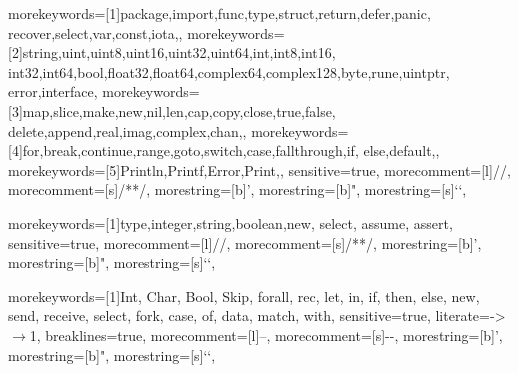 \usepackage[portuguese]{babel}
\usepackage[utf8]{inputenc}  %
\usepackage[T1]{fontenc}
\usepackage {listings}
\usepackage{tikz}
\usepackage{hyperref}

\usepackage{amsmath,amssymb}
\usepackage{listings,color}
\usepackage{alltt}
\usepackage{flushend}





%
  {morekeywords=[1]{package,import,func,type,struct,return,defer,panic,%
     recover,select,var,const,iota,},%
   morekeywords=[2]{string,uint,uint8,uint16,uint32,uint64,int,int8,int16,%
     int32,int64,bool,float32,float64,complex64,complex128,byte,rune,uintptr,%
     error,interface},%
   morekeywords=[3]{map,slice,make,new,nil,len,cap,copy,close,true,false,%
     delete,append,real,imag,complex,chan,},%
   morekeywords=[4]{for,break,continue,range,goto,switch,case,fallthrough,if,%
     else,default,},%
   morekeywords=[5]{Println,Printf,Error,Print,},%
   sensitive=true,%
   morecomment=[l]{//},%
   morecomment=[s]{/*}{*/},%
   morestring=[b]',%
   morestring=[b]",%
   morestring=[s]{`}{`},%
}

      
%
  {morekeywords=[1]{type,integer,string,boolean,new, select, assume, assert},%
   sensitive=true,%
   morecomment=[l]{//},%
   morecomment=[s]{/*}{*/},%
   morestring=[b]',%
   morestring=[b]",%
   morestring=[s]{`}{`},%
 }

%
{
  morekeywords=[1]{Int, Char, Bool, Skip, forall, rec, let, in, if, then, else, new, send, receive,
    select, fork, case, of, data, match, with},%
  sensitive=true,%
  literate={->}{{$\rightarrow$}}1,%
   breaklines=true,
   morecomment=[l]{--},%
   morecomment=[s]{{-}{-}},%
   morestring=[b]',%
   morestring=[b]",%
   morestring=[s]{`}{`},%
 }

 

\newcommand{\todo}[1]{[{\color{blue}\textbf{#1}}]}

\newcommand{\keyword}[1]{\mathsf{#1}}

